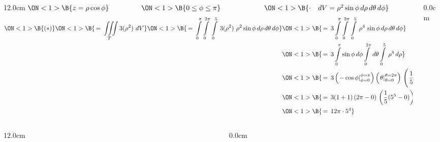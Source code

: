 \begin{frame}
\begin{columns}
\begin{column}{12.0cm}
$\ON<1>{\B{z = \rho \cos \phi}} \hspace{1.6cm} 
\ON<1>{\B{0 \le \phi \le \pi}} \hspace{2.15cm} 
\ON<1>{\B{\cdot \quad dV = \rho^2 \sin \phi \, d\rho \, d\theta \, d\phi}}$ 
\begin{align*}
\ON<1>{\B{(*)}}
\ON<1>{\B{\, = \,\iiint \limits_{T} 3(\rho^2) \,\, dV}}
\ON<1>{\B{\, = \,\int \limits_{0}^{\pi} \int \limits_{0}^{2\pi} \, \int \limits_{0}^{5} \, 3(\rho^2) \,\, \rho^2 \sin \phi \, d\rho \, d\theta \, d\phi}}
&\ON<1>{\B{\, = \,3\int \limits_{0}^{\pi} \int \limits_{0}^{2\pi} \, \int \limits_{0}^{5} \, \rho^4 \, \sin \phi \, d\rho \, d\theta \, d\phi}} \\
&\ON<1>{\B{\, = \,3\int \limits_{0}^{\pi} \sin \phi \, d\phi \int \limits_{0}^{2\pi} \, d\theta \int \limits_{0}^{5} \, \rho^4 \, d\rho}} \\
&\ON<1>{\B{\, = \,3 \left(\left.- \cos \phi \right|_{\phi = 0}^{\phi = \pi}\right) \left(\left. \theta \right|_{\theta = 0}^{\theta = 2\pi}\right) \, \left(\left.\frac{1}{5}\rho^5 \right|_{\rho = 0}^{\rho = 5} \right)}} \\
&\ON<1>{\B{\, = \,3 (1 + 1) \left( 2\pi -0\right) \, \left(\frac{1}{5}(5^5-0) \right)}} \\
&\ON<1>{\B{\, = \,12\pi \cdot 5^4}} \\
\end{align*}

\end{column}\begin{column}{0.0cm}\end{column}\end{columns}
\end{frame}

\begin{frame}
\begin{columns}\begin{column}{12.0cm}
\scriptsize
	
\end{column}\begin{column}{0.0cm}\end{column}\end{columns}
\end{frame}

